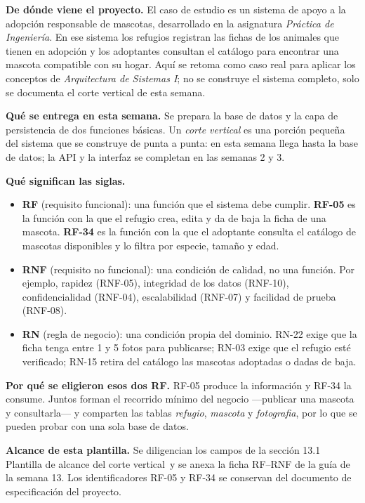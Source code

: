 \documentclass[11pt,a4paper]{article}
\begin{document}
{\small
\textbf{De dónde viene el proyecto.} El caso de estudio es un sistema de apoyo a la
adopción responsable de mascotas, desarrollado en la asignatura \emph{Práctica de
Ingeniería}. En ese sistema los refugios registran las fichas de los animales que tienen en
adopción y los adoptantes consultan el catálogo para encontrar una mascota compatible con su
hogar. Aquí se retoma como caso real para aplicar los conceptos de \emph{Arquitectura de
Sistemas I}; no se construye el sistema completo, solo se documenta el corte vertical de esta
semana.

\medskip
\textbf{Qué se entrega en esta semana.} Se prepara la base de datos y la capa de
persistencia de dos funciones básicas. Un \emph{corte vertical} es una porción pequeña del
sistema que se construye de punta a punta: en esta semana llega hasta la base de datos; la
API y la interfaz se completan en las semanas 2 y 3.

\medskip
\textbf{Qué significan las siglas.}
\begin{itemize}
\item \textbf{RF} (requisito funcional): una función que el sistema debe cumplir.
  \textbf{RF-05} es la función con la que el refugio crea, edita y da de baja la ficha de
  una mascota. \textbf{RF-34} es la función con la que el adoptante consulta el catálogo de
  mascotas disponibles y lo filtra por especie, tamaño y edad.
\item \textbf{RNF} (requisito no funcional): una condición de calidad, no una función. Por
  ejemplo, rapidez (RNF-05), integridad de los datos (RNF-10), confidencialidad (RNF-04),
  escalabilidad (RNF-07) y facilidad de prueba (RNF-08).
\item \textbf{RN} (regla de negocio): una condición propia del dominio. RN-22 exige que la
  ficha tenga entre 1 y 5 fotos para publicarse; RN-03 exige que el refugio esté verificado;
  RN-15 retira del catálogo las mascotas adoptadas o dadas de baja.
\end{itemize}

\medskip
\textbf{Por qué se eligieron esos dos RF.} RF-05 produce la información y RF-34 la consume.
Juntos forman el recorrido mínimo del negocio ---publicar una mascota y consultarla--- y
comparten las tablas \emph{refugio}, \emph{mascota} y \emph{fotografia}, por lo que se pueden
probar con una sola base de datos.

\medskip
\textbf{Alcance de esta plantilla.} Se diligencian los campos de la sección 13.1
\guillemotleft Plantilla de alcance del corte vertical\guillemotright\ y se anexa la ficha
RF--RNF de la guía de la semana 13. Los identificadores RF-05 y RF-34 se conservan del
documento de especificación del proyecto.
\par}
\end{document}
